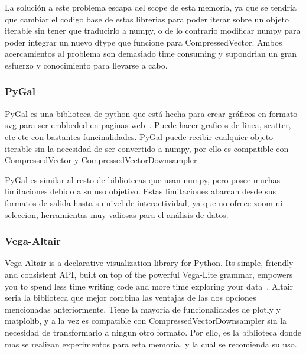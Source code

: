 La solución a este problema escapa del scope de esta memoria, ya que se tendria que cambiar el codigo base de estas librerias para poder iterar sobre un objeto iterable sin tener que traducirlo a numpy, o de lo contrario modificar numpy para poder integrar un nuevo dtype que funcione para CompressedVector. Ambos acercamientos al problema son demasiado time consuming y supondrian un gran esfuerzo y conocimiento para llevarse a cabo.

\subsubsection{PyGal}

PyGal es una biblioteca de python que está hecha para crear gráficos en formato svg para ser embbeded en paginas web~\cite{pygal}. Puede hacer graficos de linea, scatter, etc etc con bastantes funcinalidades. PyGal puede recibir cualquier objeto iterable sin la necesidad de ser convertido a numpy, por ello es compatible con CompressedVector y CompressedVectorDownsampler.

PyGal es similar al resto de bibliotecas que usan numpy, pero posee muchas limitaciones debido a su uso objetivo. Estas limitaciones abarcan desde sus formatos de salida hasta su nivel de interactividad, ya que no ofrece zoom ni seleccion, herramientas muy valiosas para el análisis de datos.

\subsubsection{Vega-Altair}

Vega-Altair is a declarative visualization library for Python. Its simple, friendly and consistent API, built on top of the powerful Vega-Lite grammar, empowers you to spend less time writing code and more time exploring your data~\cite{altair}.
Altair seria la biblioteca que mejor combina las ventajas de las dos opciones mencionadas anteriormente. Tiene la mayoria de funcionalidades de plotly y matplolib, y a la vez es compatible con CompressedVectorDownsampler sin la necesidad de transformarlo a ningun otro formato. Por ello, es la biblioteca donde mas se realizan experimentos para esta memoria, y la cual se recomienda su uso.

